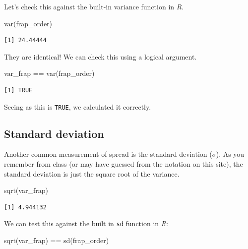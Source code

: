 \documentclass[
  letterpaper,
  DIV=11,
  numbers=noendperiod]{scrreprt}
\newenvironment{Shaded}{\begin{snugshade}}{\end{snugshade}}
\newcommand{\FunctionTok}[1]{\textcolor[rgb]{0.28,0.35,0.67}{#1}}
\newcommand{\NormalTok}[1]{\textcolor[rgb]{0.00,0.23,0.31}{#1}}
\newcommand{\SpecialCharTok}[1]{\textcolor[rgb]{0.37,0.37,0.37}{#1}}
\begin{document}
Let's check this against the built-in variance function in \emph{R}.

\begin{Shaded}
\begin{Highlighting}[]
\FunctionTok{var}\NormalTok{(frap\_order)}
\end{Highlighting}
\end{Shaded}

\begin{verbatim}
[1] 24.44444
\end{verbatim}

They are identical! We can check this using a logical argument.

\begin{Shaded}
\begin{Highlighting}[]
\NormalTok{var\_frap }\SpecialCharTok{==} \FunctionTok{var}\NormalTok{(frap\_order)}
\end{Highlighting}
\end{Shaded}

\begin{verbatim}
[1] TRUE
\end{verbatim}

Seeing as this is \texttt{TRUE}, we calculated it correctly.

\subsection{Standard deviation}\label{standard-deviation}

Another common measurement of spread is the standard deviation
(\(\sigma\)). As you remember from class (or may have guessed from the
notation on this site), the standard deviation is just the square root
of the variance.

\begin{Shaded}
\begin{Highlighting}[]
\FunctionTok{sqrt}\NormalTok{(var\_frap)}
\end{Highlighting}
\end{Shaded}

\begin{verbatim}
[1] 4.944132
\end{verbatim}

We can test this against the built in \texttt{sd} function in \emph{R}:

\begin{Shaded}
\begin{Highlighting}[]
\FunctionTok{sqrt}\NormalTok{(var\_frap) }\SpecialCharTok{==} \FunctionTok{sd}\NormalTok{(frap\_order)}
\end{Highlighting}
\end{Shaded}
\end{document}
